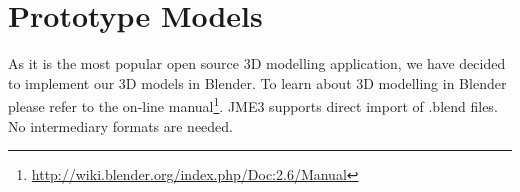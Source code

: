 \section{Prototype Models} %
\label{sec:impl_prototype_models}
As it is the most popular open source 3D modelling application, we have decided to implement our 3D models in Blender. To learn about 3D modelling in Blender please refer to the on-line manual\footnote{\url{http://wiki.blender.org/index.php/Doc:2.6/Manual}}. JME3 supports direct import of .blend files. No intermediary formats are needed.\\
